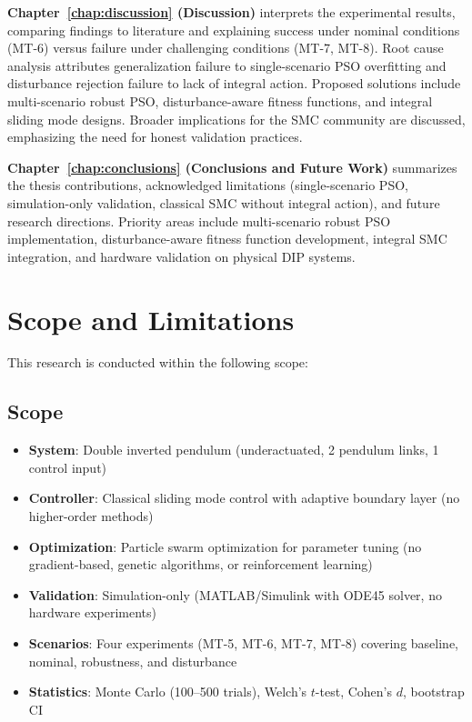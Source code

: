\textbf{Chapter~\ref{chap:discussion} (Discussion)} interprets the experimental results, comparing findings to literature and explaining success under nominal conditions (MT-6) versus failure under challenging conditions (MT-7, MT-8). Root cause analysis attributes generalization failure to single-scenario PSO overfitting and disturbance rejection failure to lack of integral action. Proposed solutions include multi-scenario robust PSO, disturbance-aware fitness functions, and integral sliding mode designs. Broader implications for the SMC community are discussed, emphasizing the need for honest validation practices.

\textbf{Chapter~\ref{chap:conclusions} (Conclusions and Future Work)} summarizes the thesis contributions, acknowledged limitations (single-scenario PSO, simulation-only validation, classical SMC without integral action), and future research directions. Priority areas include multi-scenario robust PSO implementation, disturbance-aware fitness function development, integral SMC integration, and hardware validation on physical DIP systems.

\section{Scope and Limitations}
\label{sec:scope}

This research is conducted within the following scope:

\subsection{Scope}

\begin{itemize}
    \item \textbf{System}: Double inverted pendulum (underactuated, 2 pendulum links, 1 control input)
    \item \textbf{Controller}: Classical sliding mode control with adaptive boundary layer (no higher-order methods)
    \item \textbf{Optimization}: Particle swarm optimization for parameter tuning (no gradient-based, genetic algorithms, or reinforcement learning)
    \item \textbf{Validation}: Simulation-only (MATLAB/Simulink with ODE45 solver, no hardware experiments)
    \item \textbf{Scenarios}: Four experiments (MT-5, MT-6, MT-7, MT-8) covering baseline, nominal, robustness, and disturbance
    \item \textbf{Statistics}: Monte Carlo (100--500 trials), Welch's $t$-test, Cohen's $d$, bootstrap CI
\end{itemize}

